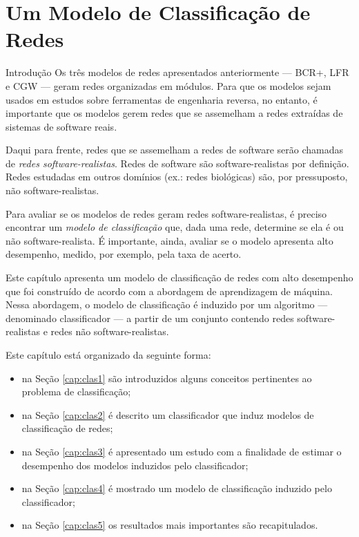 \chapter{Um Modelo de Classificação de Redes}


\begin{section}{Introdução}
	Os três modelos de redes apresentados anteriormente --- BCR+, LFR e CGW --- geram redes organizadas em módulos. Para que os modelos sejam usados em estudos sobre ferramentas de engenharia reversa, no entanto, é importante que os modelos gerem redes que se assemelham a redes extraídas de sistemas de software reais.
	
	Daqui para frente, redes que se assemelham a redes de software serão chamadas de \emph{redes software-realistas}. Redes de software são software-realistas por definição. Redes estudadas em outros domínios (ex.: redes biológicas) são, por pressuposto, não software-realistas.
	
	Para avaliar se os modelos de redes geram redes software-realistas, é preciso encontrar um \emph{modelo de classificação} que, dada uma rede, determine se ela é ou não software-realista. É importante, ainda, avaliar se o modelo apresenta alto desempenho, medido, por exemplo, pela taxa de acerto.
	
	Este capítulo apresenta um modelo de classificação de redes com alto desempenho que foi construído de acordo com a abordagem de aprendizagem de máquina. Nessa abordagem, o modelo de classificação é induzido por um algoritmo --- denominado classificador --- a partir de um conjunto contendo redes software-realistas e redes não software-realistas.
	
	Este capítulo está organizado da seguinte forma:
	
	\begin{itemize}
		\item na Seção \ref{cap:clas1} são introduzidos alguns conceitos pertinentes ao problema de classificação;
		\item na Seção \ref{cap:clas2} é descrito um classificador que induz modelos de classificação de redes;
		\item na Seção \ref{cap:clas3} é apresentado um estudo com a finalidade de estimar o desempenho dos modelos induzidos pelo classificador;
		\item na Seção \ref{cap:clas4} é mostrado um modelo de classificação induzido pelo classificador;
		\item na Seção \ref{cap:clas5} os resultados mais importantes são recapitulados.
	\end{itemize}	
	
\end{section}

